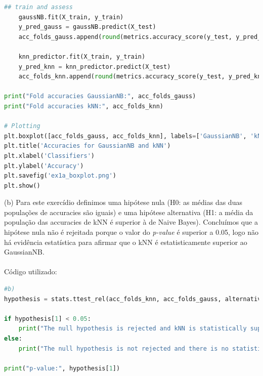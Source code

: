 \documentclass[a4paper,12pt]{article} %
\begin{document}
\begin{enumerate}
\begin{lstlisting}[language=Python]
    ## train and assess
    gaussNB.fit(X_train, y_train)
    y_pred_gauss = gaussNB.predict(X_test)
    acc_folds_gauss.append(round(metrics.accuracy_score(y_test, y_pred_gauss),4))
    
    knn_predictor.fit(X_train, y_train)
    y_pred_knn = knn_predictor.predict(X_test)
    acc_folds_knn.append(round(metrics.accuracy_score(y_test, y_pred_knn),4))

print("Fold accuracies GaussianNB:", acc_folds_gauss)
print("Fold accuracies kNN:", acc_folds_knn)

# Plotting
plt.boxplot([acc_folds_gauss, acc_folds_knn], labels=['GaussianNB', 'kNN'])
plt.title('Accuracies for GaussianNB and kNN')
plt.xlabel('Classifiers')
plt.ylabel('Accuracy')
plt.savefig('ex1a_boxplot.png')
plt.show()
        \end{lstlisting}

    
    (b) Para este exercídio definimos uma hipótese nula (H0: as médias das duas populações de accuracies são iguais) e uma hipótese alternativa (H1: a média da população das accuracies de kNN é superior à de Naive Bayes). Concluímos que a hipótese nula  não é rejeitada porque o valor do \textit{p-value} é superior a 0.05, logo não há evidência estatística para afirmar que o kNN é estatisticamente superior ao GaussianNB. 
    \\ \\
    Código utilizado:
    \begin{lstlisting}[language=Python]
#b) 
hypothesis = stats.ttest_rel(acc_folds_knn, acc_folds_gauss, alternative='greater')

if hypothesis[1] < 0.05:
    print("The null hypothesis is rejected and kNN is statistically superior to GaussianNB")
else:
    print("The null hypothesis is not rejected and there is no statistical evidence that kNN is superior to GaussianNB")

print("p-value:", hypothesis[1])
    \end{lstlisting}


\end{enumerate}
\end{document}
